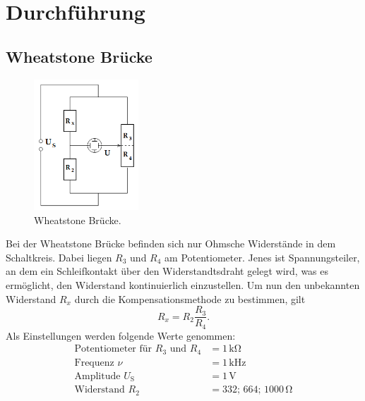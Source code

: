 \section{Durchführung}
\label{sec:Durchführung}

\subsection{Wheatstone Brücke}
\begin{figure}[H]
    \centering
        \centering
        \includegraphics[width=0.35\textwidth]{Bilder/wheatstone.png}
        \caption{Wheatstone Brücke. \cite{anleitung}}
    \hfill
    \label{fig:f2}
\end{figure}
\noindent Bei der Wheatstone Brücke befinden sich nur Ohmsche Widerstände in 
dem Schaltkreis. Dabei liegen $R_3$ und $R_4$ am Potentiometer. Jenes ist
Spannungsteiler, an dem ein Schleifkontakt über den Widerstandtsdraht gelegt
wird, was es ermöglicht, den Widerstand kontinuierlich einzustellen. Um nun
den unbekannten Widerstand $R_x$ durch die Kompensationsmethode zu bestimmen, 
gilt
\begin{equation}
    \label{eqn:1}
    R_x = R_2 \frac{R_3}{R_4}.
\end{equation}
\noindent Als Einstellungen werden folgende Werte genommen:
\begin{align*}
    \label{eqn:werte1}
    \text{Potentiometer für } R_3 \text{ und } R_4 &= 1\,\unit{\kilo\ohm} \\
    \text{Frequenz } \nu &= 1\,\unit{\kilo\hertz} \\
    \text{Amplitude } U_{\text{S}} &= 1\,\unit{\volt} \\
    \text{Widerstand } R_2 &= 332;\, 664;\, 1000\,\unit{\ohm} \\
\end{align*}


